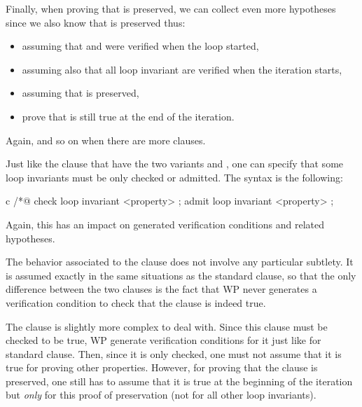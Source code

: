 

Finally, when proving that  is preserved, we can collect even
more hypotheses since we also know that  is preserved thus:
\begin{itemize}
  \item assuming that  and  were verified when the
        loop started,
  \item assuming also that all loop invariant are verified when the iteration
        starts,
  \item assuming that  is preserved,
  \item prove that  is still true at the end of the iteration.
\end{itemize}
Again, and so on when there are more  clauses.






Just like the  clause that have the two variants
 and , one can specify that some
loop invariants must be only checked or admitted. The syntax is the following:


\begin{CodeBlock}{c}
/*@ check loop invariant <property> ;
    admit loop invariant <property> ;
\end{CodeBlock}


Again, this has an impact on generated verification conditions and related
hypotheses.


The behavior associated to the  clause does not
involve any particular subtlety. It is assumed exactly in the same situations as
the standard  clause, so that the only difference
between the two clauses is the fact that WP never generates a verification
condition to check that the  clause is indeed
true.


The  clause is slightly more complex to deal
with. Since this clause must be checked to be true, WP generate verification
conditions for it just like for standard  clause.
Then, since it is only checked, one must not assume that it is true for proving
other properties. However, for proving that the 
clause is preserved, one still has to assume that it is true at the beginning of
the iteration but \textit{only} for this proof of preservation (not for all other
loop invariants).


